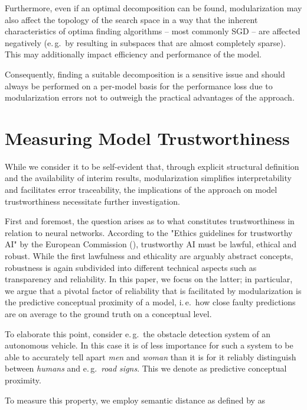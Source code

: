 \documentclass[conference]{IEEEtran}
\begin{document}
Furthermore, even if an optimal decomposition can be found, modularization may also affect the topology of the search space in a way that the inherent characteristics of optima finding algorithms -- most commonly SGD -- are affected negatively (e.\,g.\ by resulting in subspaces that are almost completely sparse). This may additionally impact efficiency and performance of the model.

Consequently, finding a suitable decomposition is a sensitive issue and should always be performed on a per-model basis for the performance loss due to modularization errors not to outweigh the practical advantages of the approach.

\section{Measuring Model Trustworthiness%
         \label{sec:semantic_distance}}

While we consider it to be self-evident that, through explicit structural definition and the availability of interim results, modularization simplifies interpretability and facilitates error traceability, the implications of the approach on model trustworthiness necessitate further investigation.

First and foremost, the question arises as to what constitutes trustworthiness in relation to neural networks. According to the "Ethics guidelines for trustworthy AI" by the European Commission (\cite{Robotics_and_Artificial_Intelligence_Unit_A_12019-of}), trustworthy AI must be lawful, ethical and robust. While the first lawfulness and ethicality are arguably abstract concepts, robustness is again subdivided into different technical aspects such as transparency and reliability. In this paper, we focus on the latter; in particular, we argue that a pivotal factor of reliability that is facilitated by modularization is the predictive conceptual proximity of a model, i.\,e.\ how close faulty predictions are on average to the ground truth on a conceptual level.

To elaborate this point, consider e.\,g.\ the obstacle detection system of an autonomous vehicle. In this case it is of less importance for such a system to be able to accurately tell apart \textit{men} and \textit{woman} than it is for it reliably distinguish between \textit{humans} and e.\,g.\ \textit{road signs}. This we denote as predictive conceptual proximity.

To measure this property, we employ semantic distance as defined by \cite{Fergus2010-or} as
\end{document}
